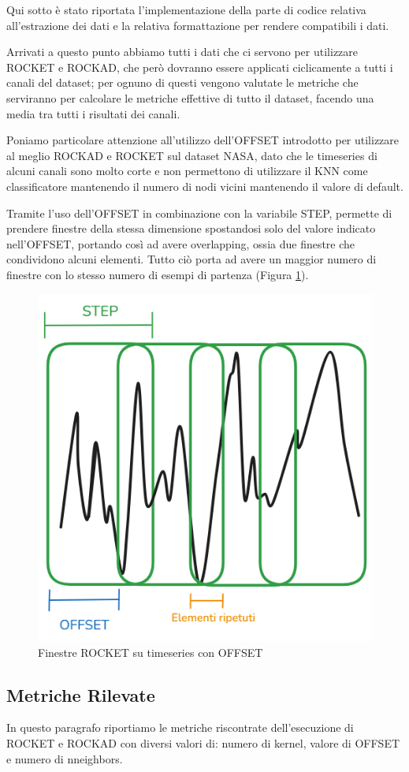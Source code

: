 Qui sotto è stato riportata l'implementazione della parte di codice relativa all'estrazione dei dati e la relativa formattazione per rendere compatibili i dati.



Arrivati a questo punto abbiamo tutti i dati che ci servono per utilizzare ROCKET e ROCKAD, che però dovranno essere applicati ciclicamente a tutti i canali del dataset; per ognuno di questi vengono valutate le metriche che serviranno per calcolare le metriche effettive di tutto il dataset, facendo una media tra tutti i risultati dei canali.

Poniamo particolare attenzione all'utilizzo dell'OFFSET introdotto per utilizzare al meglio ROCKAD e ROCKET sul dataset NASA, dato che le timeseries di alcuni canali sono molto corte e non permettono di utilizzare il KNN come classificatore mantenendo il numero di nodi vicini mantenendo il valore di default.

Tramite l'uso dell'OFFSET in combinazione con la variabile STEP, permette di prendere finestre della stessa dimensione spostandosi solo del valore indicato nell'OFFSET, portando così ad avere overlapping, ossia due finestre che condividono alcuni elementi.
Tutto ciò porta ad avere un maggior numero di finestre con lo stesso numero di esempi di partenza (Figura \ref{fig:OFFSET_STEP}).

\begin{figure}[!ht]
    \centering
    \includegraphics[width=0.5\linewidth]{images//Capitolo4/OFFSET_STEP.png}
    \caption{Finestre ROCKET su timeseries con OFFSET}
    \label{fig:OFFSET_STEP}
\end{figure}

\subsection{Metriche Rilevate}
In questo paragrafo riportiamo le metriche riscontrate dell'esecuzione di ROCKET e ROCKAD con diversi valori di: numero di kernel, valore di OFFSET e numero di n\textunderscore neighbors.

